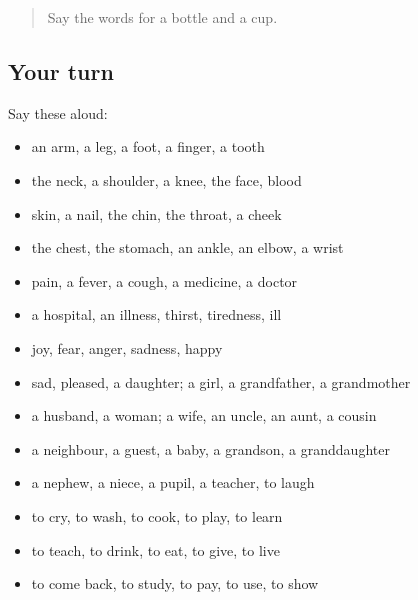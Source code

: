 \label{lesson:FR-R77-first-pass-the-body-family-doing-and-food}



\begin{quote}
Say the words for a bottle and a cup.
\end{quote}

\subsection*{Your turn}
Say these aloud:

\begin{itemize}
\raggedright
  \item an arm, a leg, a foot, a finger, a tooth
  \item the neck, a shoulder, a knee, the face, blood
  \item skin, a nail, the chin, the throat, a cheek
  \item the chest, the stomach, an ankle, an elbow, a wrist
  \item pain, a fever, a cough, a medicine, a doctor
  \item a hospital, an illness, thirst, tiredness, ill
  \item joy, fear, anger, sadness, happy
  \item sad, pleased, a daughter; a girl, a grandfather, a grandmother
  \item a husband, a woman; a wife, an uncle, an aunt, a cousin
  \item a neighbour, a guest, a baby, a grandson, a granddaughter
  \item a nephew, a niece, a pupil, a teacher, to laugh
  \item to cry, to wash, to cook, to play, to learn
  \item to teach, to drink, to eat, to give, to live
  \item to come back, to study, to pay, to use, to show
\end{itemize}

